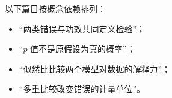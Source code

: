 以下篇目按概念依赖排列：

\begin{itemize}
\tightlist
\item \hyperref[sec:11-Mathematical-Statistics/05-Hypothesis-Testing/01]{``两类错误与功效共同定义检验''}；
\item \hyperref[sec:11-Mathematical-Statistics/05-Hypothesis-Testing/02]{``\texorpdfstring{\(p\) 值不是原假设为真的概率}{p 值不是原假设为真的概率}''}；
\item \hyperref[sec:11-Mathematical-Statistics/05-Hypothesis-Testing/03]{``似然比比较两个模型对数据的解释力''}；
\item \hyperref[sec:11-Mathematical-Statistics/05-Hypothesis-Testing/04]{``多重比较改变错误的计量单位''}。
\end{itemize}
